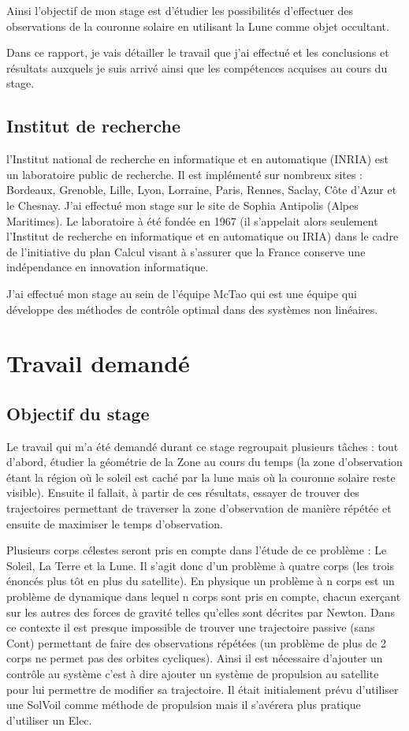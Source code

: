\documentclass[11pt]{article} %
\begin{document}
		Ainsi l'objectif de mon stage est d'étudier les possibilités d'effectuer des observations de la couronne solaire en utilisant la Lune comme objet occultant.
		 
		Dans ce rapport, je vais détailler le travail que j'ai effectué et les conclusions et résultats auxquels je suis arrivé ainsi que les compétences acquises au cours du stage. 
		 
		\subsection{Institut de recherche}
		
		l'Institut national de recherche en informatique et en automatique (INRIA) est un laboratoire public de recherche. Il est implémenté sur nombreux sites :  Bordeaux, Grenoble, Lille, Lyon, Lorraine, Paris, Rennes, Saclay, Côte d'Azur et le Chesnay. J'ai effectué mon stage sur le site de Sophia Antipolis (Alpes Maritimes). Le laboratoire à été fondée en 1967 (il s'appelait alors seulement l'Institut de recherche en informatique et en automatique ou IRIA) dans le cadre de l'initiative du plan Calcul visant à s'assurer que la France conserve une indépendance en innovation informatique.
		
		J'ai effectué mon stage au sein de l'équipe McTao qui est une équipe qui développe des méthodes de contrôle optimal dans des systèmes non linéaires.
		
		\section{Travail demandé}
		\subsection{Objectif du stage}
		Le travail qui m'a été demandé durant ce stage regroupait plusieurs tâches : tout d'abord, étudier la géométrie de la \gls{Zone} au cours du temps (la zone d'observation étant la région où le soleil est caché par la lune mais où la couronne solaire reste visible). Ensuite il fallait, à partir de ces résultats, essayer de trouver des trajectoires permettant de traverser la zone d'observation de manière répétée et ensuite de maximiser le temps d'observation.
		
		Plusieurs corps célestes seront pris en compte dans l'étude de ce problème : Le Soleil, La Terre et la Lune. Il s'agit donc d'un problème à quatre corps (les trois énoncés plus tôt en plus du satellite). En physique un problème à n corps est un problème de dynamique dans lequel n corps sont pris en compte, chacun exerçant sur les autres des forces de gravité telles qu'elles sont décrites par Newton. Dans ce contexte il est presque impossible de trouver une trajectoire passive (sans \gls{Cont}) permettant de faire des observations répétées (un problème de plus de 2 corps ne permet pas des orbites cycliques). Ainsi il est nécessaire d'ajouter un contrôle au système c'est à dire ajouter un système de propulsion au satellite pour lui permettre de modifier sa trajectoire. Il était initialement prévu d'utiliser une \gls{SolVoil} comme méthode de propulsion mais il s'avérera plus pratique d'utiliser un \gls{Elec}.
			
\end{document}
